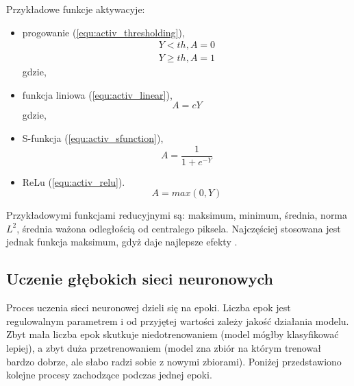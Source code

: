 {Przykładowe funkcje aktywacyje:
\begin{itemize}
\item progowanie (\ref{equ:activ_thresholding}),
\begin{equation}
\begin{aligned}
Y < th, A = 0\\
Y \geq th, A = 1
\end{aligned}
\label{equ:activ_thresholding}
\end{equation}
gdzie,
\item funkcja liniowa (\ref{equ:activ_linear}),
\begin{equation}
A = cY
\label{equ:activ_linear}
\end{equation}
gdzie,
\item S-funkcja (\ref{equ:activ_sfunction}),
\begin{equation}
A = \frac{1}{1+e^{-Y}}
\label{equ:activ_sfunction}
\end{equation}
\item ReLu (\ref{equ:activ_relu}).
\begin{equation}
A = max(0,Y)
\label{equ:activ_relu}
\end{equation}
\end{itemize}

Przykładowymi funkcjami reducyjnymi są: maksimum, minimum, średnia, norma \begin{math}L^{2}\end{math}, średnia ważona odległością od centralego piksela. Najczęściej stosowana jest jednak funkcja maksimum, gdyż daje najlepsze efekty \cite{Scherer2010EvaluationOP}.
}

\subsection{Uczenie głębokich sieci neuronowych}
Proces uczenia sieci neuronowej dzieli się na epoki. Liczba epok jest regulowalnym parametrem i od przyjętej wartości zależy jakość działania modelu. Zbyt mała liczba epok skutkuje niedotrenowaniem (model mógłby klasyfikować lepiej), a zbyt duża przetrenowaniem (model zna zbiór na którym trenował bardzo dobrze, ale słabo radzi sobie z nowymi zbiorami). Poniżej przedstawiono kolejne procesy zachodzące podczas jednej epoki.

